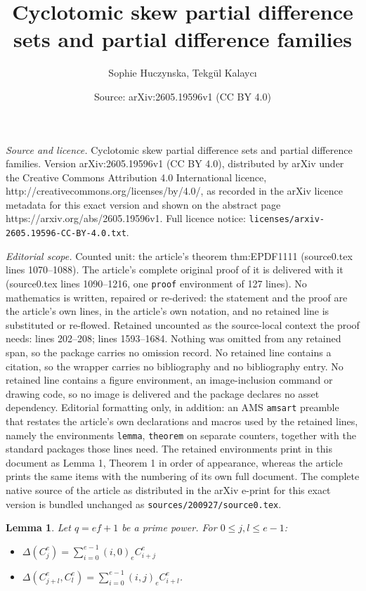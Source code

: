 \documentclass[10pt,a4paper]{amsart}
\title{Cyclotomic skew partial difference sets and partial difference families}
\author{Sophie Huczynska, Tekg\"ul Kalayc{\i}}
\date{Source: arXiv:2605.19596v1 (CC BY 4.0)}
\newtheorem{lemma}{Lemma}
\begin{document}
\maketitle

\noindent\emph{Source and licence.} Cyclotomic skew partial difference sets and partial difference families. Version arXiv:2605.19596v1 (CC BY 4.0), distributed by arXiv under the Creative Commons Attribution 4.0 International licence, http://creativecommons.org/licenses/by/4.0/, as recorded in the arXiv licence metadata for this exact version and shown on the abstract page https://arxiv.org/abs/2605.19596v1. Full licence notice: \texttt{licenses/arxiv-2605.19596-CC-BY-4.0.txt}.\par\smallskip

\noindent\textit{Editorial scope.} Counted unit: the article's theorem thm:EPDF1111 (source0.tex lines 1070--1088). The article's complete original proof of it is delivered with it (source0.tex lines 1090--1216, one \texttt{proof} environment of 127 lines). No mathematics is written, repaired or re-derived: the statement and the proof are the article's own lines, in the article's own notation, and no retained line is substituted or re-flowed.  Retained uncounted as the source-local context the proof needs: lines 202--208; lines 1593--1684.  Nothing was omitted from any retained span, so the package carries no omission record.  No retained line contains a citation, so the wrapper carries no bibliography and no bibliography entry.  No retained line contains a figure environment, an image-inclusion command or drawing code, so no image is delivered and the package declares no asset dependency.  Editorial formatting only, in addition: an AMS \texttt{amsart} preamble that restates the article's own declarations and macros used by the retained lines, namely the environments \texttt{lemma}, \texttt{theorem} on separate counters, together with the standard packages those lines need.  The retained environments print in this document as Lemma 1, Theorem 1 in order of appearance, whereas the article prints the same items with the numbering of its own full document.  The complete native source of the article as distributed in the arXiv e-print for this exact version is bundled unchanged as \texttt{sources/200927/source0.tex}.
\begin{lemma}\label{lemma:cyc}
Let $q=ef+1$ be a prime power.  For $0 \leq j,l \leq e-1$:
\begin{itemize}
\item[(i)] $\Delta(C_j^e)=\sum_{i=0}^{e-1} (i,0)_e C_{i+j}^e$
\item[(ii)] $\Delta(C_{j+l}^e,C_l^e)=\sum_{i=0}^{e-1} (i,j)_e C_{i+l}^e$.
\end{itemize}
\end{lemma}
\end{document}
